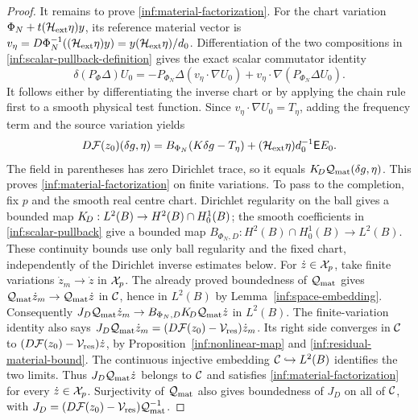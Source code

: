\begin{proof}
It remains to prove \eqref{inf:material-factorization}.
For the chart variation $\Phi_N+t(\mathcal H_{\mathrm{ext}}\eta)y$, its reference material
vector is
$v_\eta=D\Phi_N^{-1}((\mathcal H_{\mathrm{ext}}\eta)y)=y(\mathcal H_{\mathrm{ext}}\eta)/d_0$.
Differentiation of the two compositions in
\eqref{inf:scalar-pullback-definition} gives the exact scalar
commutator identity
\[
 \delta(P_\Phi\Delta)U_0
 =-P_{\Phi_N}\Delta(v_\eta\cdot\nabla U_0)
       +v_\eta\cdot\nabla(P_{\Phi_N}\Delta U_0).
\]
It follows either by differentiating the inverse chart or by
applying the chain rule first to a smooth physical test function.
Since $v_\eta\cdot\nabla U_0=T_\eta$, adding the frequency term
and the source variation yields
\[
 D\mathcal F(z_0)(\delta g,\eta)
 =B_{\Phi_N}(K\delta g-T_\eta)
       +(\mathcal H_{\mathrm{ext}}\eta)d_0^{-1}\mathsf E E_0.
\]
The field in parentheses has zero Dirichlet trace, so it equals
$K_{\!D}\mathcal Q_{\mathrm{mat}}(\delta g,\eta)$. This proves
\eqref{inf:material-factorization} on finite variations.
To pass to the completion, fix $p$ and the smooth real centre chart.
Dirichlet regularity on the ball gives a bounded map
$K_{\!D}:L^2(B)\to H^2(B)\cap H^1_0(B)$; the smooth coefficients in
\eqref{inf:scalar-pullback} give a bounded map
$B_{\Phi_N,D}:H^2(B)\cap H^1_0(B)\to L^2(B)$.
These continuity bounds use only ball regularity and the fixed
chart, independently of the Dirichlet inverse estimates below.
For $\dot z\in\mathcal X_p$, take finite variations
$\dot z_m\to\dot z$ in $\mathcal X_p$.
The already proved boundedness of $\mathcal Q_{\mathrm{mat}}$ gives
$\mathcal Q_{\mathrm{mat}}\dot z_m\to\mathcal Q_{\mathrm{mat}}\dot z$ in $\mathcal C$, hence in $L^2(B)$ by
Lemma~\ref{inf:space-embedding}. Consequently
$J_D\mathcal Q_{\mathrm{mat}}\dot z_m\to B_{\Phi_N,D}K_{\!D}\mathcal Q_{\mathrm{mat}}\dot z$ in $L^2(B)$.
The finite-variation identity also says
$J_D\mathcal Q_{\mathrm{mat}}\dot z_m=(D\mathcal F(z_0)-\mathcal V_{\mathrm{res}})\dot z_m$.
Its right side converges in $\mathcal C$ to
$(D\mathcal F(z_0)-\mathcal V_{\mathrm{res}})\dot z$, by
Proposition~\ref{inf:nonlinear-map} and
\eqref{inf:residual-material-bound}. The continuous injective
embedding $\mathcal C\hookrightarrow L^2(B)$ identifies the two limits.
Thus $J_D\mathcal Q_{\mathrm{mat}}\dot z$ belongs to $\mathcal C$ and satisfies
\eqref{inf:material-factorization} for every $\dot z\in\mathcal X_p$.
Surjectivity of $\mathcal Q_{\mathrm{mat}}$ also gives boundedness of $J_D$ on all
of $\mathcal C$, with
$J_D=(D\mathcal F(z_0)-\mathcal V_{\mathrm{res}})\mathcal Q_{\mathrm{mat}}^{-1}$.
\end{proof}
